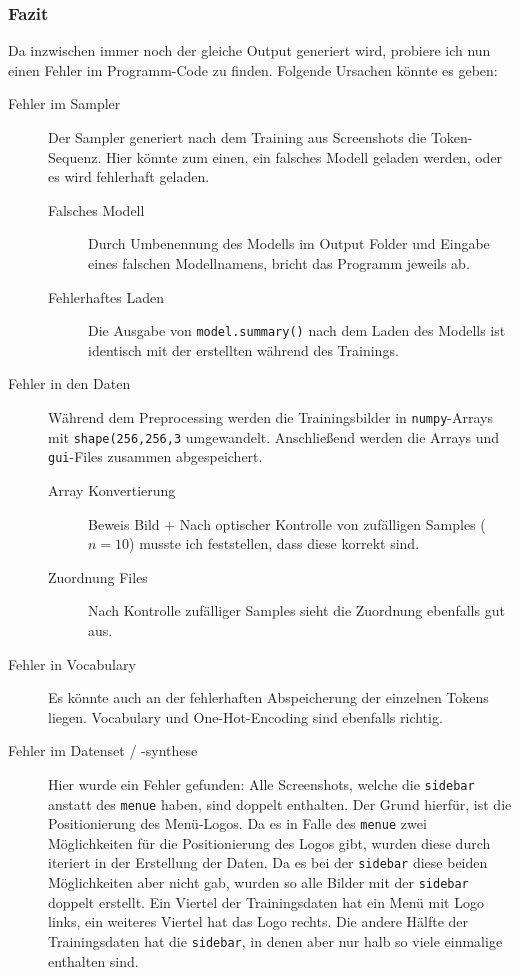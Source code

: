 \documentclass[pdftex,a4paper,halfparskip, article]{scrartcl}
\begin{document}
\subsubsection*{Fazit}

Da inzwischen immer noch der gleiche Output generiert wird, probiere ich nun einen Fehler im Programm-Code zu finden. Folgende Ursachen könnte es geben:

\begin{description}
	\item[Fehler im Sampler] Der Sampler generiert nach dem Training aus Screenshots die Token-Sequenz. Hier könnte zum einen, ein falsches Modell geladen werden, oder es wird fehlerhaft geladen.
	
	\begin{description}
		\item[Falsches Modell] Durch Umbenennung des Modells im Output Folder und Eingabe eines falschen Modellnamens, bricht das Programm jeweils ab.
		\item[Fehlerhaftes Laden] Die Ausgabe von \texttt{model.summary()} nach dem Laden des Modells ist identisch mit der erstellten während des Trainings.
	\end{description}
	
	\item[Fehler in den Daten] Während dem Preprocessing werden die Trainingsbilder in \texttt{numpy}-Arrays mit \texttt{shape(256,256,3} umgewandelt. Anschließend werden die Arrays und \texttt{gui}-Files zusammen abgespeichert.
	
	\begin{description}
		\item[Array Konvertierung] Beweis Bild + Nach optischer Kontrolle von zufälligen Samples ($n=10$) musste ich feststellen, dass diese korrekt sind.
		\item[Zuordnung Files] Nach Kontrolle zufälliger Samples sieht die Zuordnung ebenfalls gut aus.
	\end{description}
	
	\item[Fehler in Vocabulary] Es könnte auch an der fehlerhaften Abspeicherung der einzelnen Tokens liegen. Vocabulary und One-Hot-Encoding sind ebenfalls richtig.
	
	\item[Fehler im Datenset / -synthese] Hier wurde ein Fehler gefunden: Alle Screenshots, welche die \texttt{sidebar} anstatt des \texttt{menue} haben, sind doppelt enthalten. Der Grund hierfür, ist die Positionierung des Menü-Logos. Da es in Falle des \texttt{menue} zwei Möglichkeiten für die Positionierung des Logos gibt, wurden diese durch iteriert in der Erstellung der Daten. Da es bei der \texttt{sidebar} diese beiden Möglichkeiten aber nicht gab, wurden so alle Bilder mit der \texttt{sidebar} doppelt erstellt. Ein Viertel der Trainingsdaten hat ein Menü mit Logo links, ein weiteres Viertel hat das Logo rechts. Die andere Hälfte der Trainingsdaten hat die \texttt{sidebar}, in denen aber nur halb so viele einmalige enthalten sind.
	
\end{description}
\end{document}
